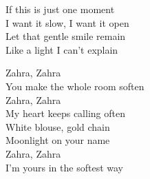 \begin{lyrics}
If this is just one moment\\
I want it slow, I want it open\\
Let that gentle smile remain\\
Like a light I can’t explain

Zahra, Zahra\\
You make the whole room soften\\
Zahra, Zahra\\
My heart keeps calling often\\
White blouse, gold chain\\
Moonlight on your name\\
Zahra, Zahra\\
I’m yours in the softest way
\end{lyrics}

